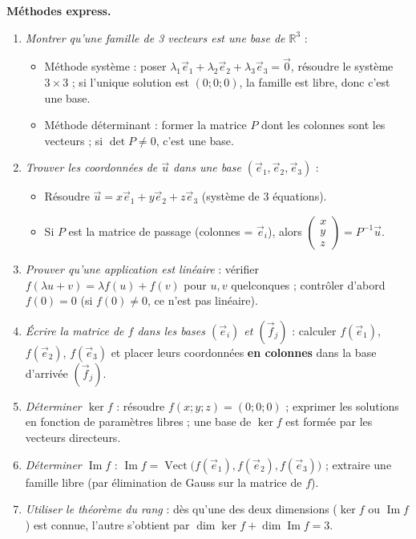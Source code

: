 \documentclass[11pt]{article}
\begin{document}
\begin{aretenir}
\textbf{Méthodes express.}
\begin{enumerate}
  \item \emph{Montrer qu'une famille de 3 vecteurs est une base de $\mathbb{R}^3$} :
  \begin{itemize}
    \item Méthode système : poser $\lambda_1\vec{e}_1+\lambda_2\vec{e}_2+\lambda_3\vec{e}_3=\vec{0}$, résoudre le système $3\times 3$ ; si l'unique solution est $(0;0;0)$, la famille est libre, donc c'est une base.
    \item Méthode déterminant : former la matrice $P$ dont les colonnes sont les vecteurs ; si $\det P \neq 0$, c'est une base.
  \end{itemize}
  \item \emph{Trouver les coordonnées de $\vec{u}$ dans une base $(\vec{e}_1,\vec{e}_2,\vec{e}_3)$} :
  \begin{itemize}
    \item Résoudre $\vec{u}=x\vec{e}_1+y\vec{e}_2+z\vec{e}_3$ (système de 3 équations).
    \item Si $P$ est la matrice de passage (colonnes = $\vec{e}_i$), alors $\begin{pmatrix}x\\y\\z\end{pmatrix}=P^{-1}\vec{u}$.
  \end{itemize}
  \item \emph{Prouver qu'une application est linéaire} : vérifier $f(\lambda u+v)=\lambda f(u)+f(v)$ pour $u,v$ quelconques ; contrôler d'abord $f(0)=0$ (si $f(0)\neq 0$, ce n'est pas linéaire).
  \item \emph{Écrire la matrice de $f$ dans les bases $(\vec{e}_i)$ et $(\vec{f}_j)$} : calculer $f(\vec{e}_1)$, $f(\vec{e}_2)$, $f(\vec{e}_3)$ et placer leurs coordonnées \textbf{en colonnes} dans la base d'arrivée $(\vec{f}_j)$.
  \item \emph{Déterminer $\ker f$} : résoudre $f(x;y;z)=(0;0;0)$ ; exprimer les solutions en fonction de paramètres libres ; une base de $\ker f$ est formée par les vecteurs directeurs.
  \item \emph{Déterminer $\operatorname{Im}f$} : $\operatorname{Im}f=\operatorname{Vect}\big(f(\vec{e}_1),f(\vec{e}_2),f(\vec{e}_3)\big)$ ; extraire une famille libre (par élimination de Gauss sur la matrice de $f$).
  \item \emph{Utiliser le théorème du rang} : dès qu'une des deux dimensions ($\ker f$ ou $\operatorname{Im}f$) est connue, l'autre s'obtient par $\dim\ker f+\dim\operatorname{Im}f=3$.
\end{enumerate}
\end{aretenir}
\end{document}
